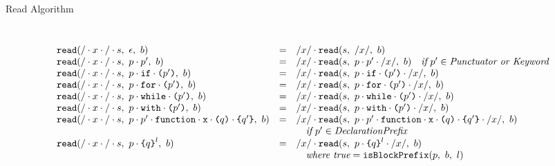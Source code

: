 \documentclass[preprint,10pt]{sigplanconf}
\begin{document}
\begin{displayfigure*}{\label{fig:read}Read Algorithm}
\[\begin{array}{lcll}
    \\ \\
    \texttt{read}(/\cdot x \cdot /\cdot s,~\epsilon,~b)
    &=&
    /x/ \cdot 
      \texttt{read}(s,~/x/,~b)
   
    \\
    \texttt{read}(/\cdot x \cdot /\cdot s,~p \cdot p',~b)
    &=&
    /x/ \cdot 
      \texttt{read}(s,~
        p \cdot p' \cdot /x/
      ,~b)
   
    \quad \textit{if}~p' \in \textit{Punctuator or Keyword}
    \\
    \texttt{read}(/\cdot x \cdot /\cdot s,~
      p \cdot \texttt{if} \cdot \texttt{(}p'\texttt{)}
    ,~b)
    &=&
    /x/ \cdot 
      \texttt{read}(s,~p \cdot \texttt{if} \cdot \texttt{(}p'\texttt{)} \cdot /x/,~b)
   
    \\
    \texttt{read}(/\cdot x \cdot /\cdot s,~
      p \cdot \texttt{for} \cdot \texttt{(}p'\texttt{)}
    ,~b)
    &=&
    /x/ \cdot 
      \texttt{read}(s,~p \cdot \texttt{for} \cdot \texttt{(}p'\texttt{)} \cdot /x/,~b)
   
    \\
    \texttt{read}(/\cdot x \cdot /\cdot s,~
      p \cdot \texttt{while} \cdot \texttt{(}p'\texttt{)}
    ,~b)
    &=&
    /x/ \cdot 
      \texttt{read}(s,~p \cdot \texttt{while} \cdot \texttt{(}p'\texttt{)} \cdot /x/,~b)
   
    \\
    \texttt{read}(/\cdot x \cdot /\cdot s,~
      p \cdot \texttt{with} \cdot \texttt{(}p'\texttt{)}
    ,~b)
    &=&
    /x/ \cdot 
      \texttt{read}(s,~p \cdot \texttt{with} \cdot \texttt{(}p'\texttt{)} \cdot /x/,~b)
   
    \\
    \texttt{read}(/\cdot x \cdot /\cdot s,~
      p \cdot p' \cdot \texttt{function} \cdot \texttt{x} 
      \cdot \texttt{(}q\texttt{)} \cdot \texttt{\{}q'\texttt{\}}
    ,~b)
    &=&
    /x/ \cdot 
      \texttt{read}(s,~
      p \cdot p' 
      \cdot \texttt{function} \cdot \texttt{x} \cdot 
      \texttt{(}q\texttt{)} \cdot \texttt{\{}q'\texttt{\}}\cdot /x/
      ,~b)
    \\
    && \quad \textit{if}~p' \in \textit{DeclarationPrefix}
    \\
    \texttt{read}(/\cdot x \cdot / \cdot s,~
      p \cdot \texttt{\{}q\texttt{\}}^{l}
    ,~b)
    &=&
    /x/ \cdot 
      \texttt{read}(s,~
        p \cdot \texttt{\{}q\texttt{\}}^{l}\cdot /x/
      ,~b)
   
    \\
    && \quad \textit{where true} = \texttt{isBlockPrefix}(p,~b,~l) \\
    

    \\ \\
    

\end{array}\]
\end{displayfigure*}
\end{document}
